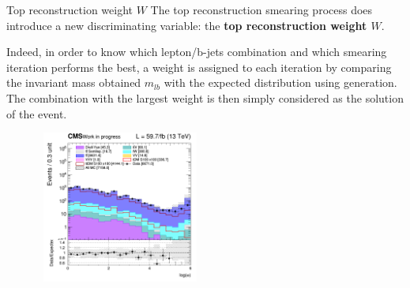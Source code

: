 \documentclass[8pt]{beamer}
\begin{document}
\begin{frame}{Top reconstruction weight $W$}
\justifying
The top reconstruction smearing process does introduce a new discriminating variable: the \textbf{top reconstruction weight $W$}. \vfill

Indeed, in order to know which lepton/b-jets combination and which smearing iteration performs the best, a weight is assigned to each iteration by comparing the invariant mass obtained $m_{lb}$ with the expected distribution using generation. The combination with the largest weight is then simply considered as the solution of the event. \vfill

\begin{figure}[htbp]
\centering
\begin{minipage}[b]{.99\textwidth}
\begin{center}
\includegraphics[width=5.5cm, height=5cm]{figs/2018/SmearSR-ttDM-scalar100/log_cratio_topCR_ll_reco_weight.png}
\end{center}
\end{minipage}\hfill
\label{fig:SRdiscmblt}
\end{figure}
\end{frame}
\end{document}
